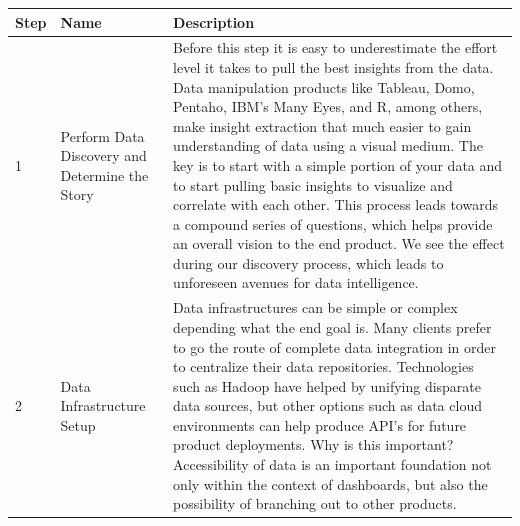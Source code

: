 \documentclass[]{book}
\begin{document}
\begin{longtable}[]{@{}lll@{}}
\toprule
\begin{minipage}[b]{0.04\columnwidth}\raggedright
\textbf{Step}\strut
\end{minipage} & \begin{minipage}[b]{0.11\columnwidth}\raggedright
\textbf{Name}\strut
\end{minipage} & \begin{minipage}[b]{0.76\columnwidth}\raggedright
\textbf{Description}\strut
\end{minipage}\tabularnewline
\midrule
\endhead
\begin{minipage}[t]{0.04\columnwidth}\raggedright
1\strut
\end{minipage} & \begin{minipage}[t]{0.11\columnwidth}\raggedright
Perform Data Discovery and Determine the Story\strut
\end{minipage} & \begin{minipage}[t]{0.76\columnwidth}\raggedright
Before this step it is easy to underestimate the effort level it takes to pull the best insights from the data. Data manipulation products like Tableau, Domo, Pentaho, IBM's Many Eyes, and R, among others, make insight extraction that much easier to gain understanding of data using a visual medium. The key is to start with a simple portion of your data and to start pulling basic insights to visualize and correlate with each other. This process leads towards a compound series of questions, which helps provide an overall vision to the end product. We see the effect during our discovery process, which leads to unforeseen avenues for data intelligence.\strut
\end{minipage}\tabularnewline
\begin{minipage}[t]{0.04\columnwidth}\raggedright
2\strut
\end{minipage} & \begin{minipage}[t]{0.11\columnwidth}\raggedright
Data Infrastructure Setup\strut
\end{minipage} & \begin{minipage}[t]{0.76\columnwidth}\raggedright
Data infrastructures can be simple or complex depending what the end goal is. Many clients prefer to go the route of complete data integration in order to centralize their data repositories. Technologies such as Hadoop have helped by unifying disparate data sources, but other options such as data cloud environments can help produce API's for future product deployments. Why is this important? Accessibility of data is an important foundation not only within the context of dashboards, but also the possibility of branching out to other products.\strut

\end{minipage}
\end{longtable}
\end{document}
